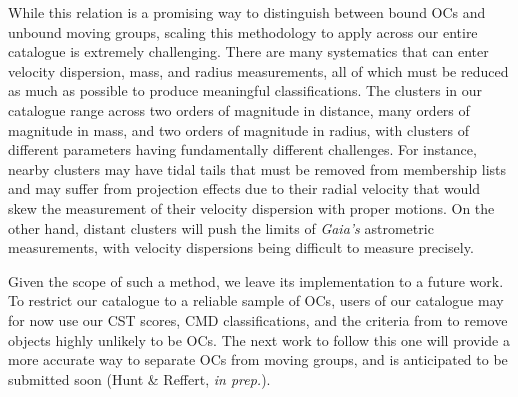 While this relation is a promising way to distinguish between bound OCs and unbound moving groups, scaling this methodology to apply across our entire catalogue is extremely challenging. There are many systematics that can enter velocity dispersion, mass, and radius measurements, all of which must be reduced as much as possible to produce meaningful classifications. The clusters in our catalogue range across two orders of magnitude in distance, many orders of magnitude in mass, and two orders of magnitude in radius, with clusters of different parameters having fundamentally different challenges. For instance, nearby clusters may have tidal tails that must be removed from membership lists and may suffer from projection effects due to their radial velocity that would skew the measurement of their velocity dispersion with proper motions. On the other hand, distant clusters will push the limits of \emph{Gaia's} astrometric measurements, with velocity dispersions being difficult to measure precisely.

Given the scope of such a method, we leave its implementation to a future work. To restrict our catalogue to a reliable sample of OCs, users of our catalogue may for now use our CST scores, CMD classifications, and the criteria from \cite{cantat-gaudin_clusters_2020} to remove objects highly unlikely to be OCs. The next work to follow this one will provide a more accurate way to separate OCs from moving groups, and is anticipated to be submitted soon (Hunt \& Reffert, \emph{in prep.}).






